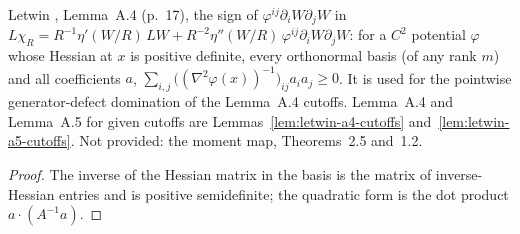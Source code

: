 \begin{lemma}
  \label{lem:letwin-inverse-hessian-quadratic}
  \leanok
  Letwin \cite{Letwin2026QuadraticKLS}, Lemma~A.4 (p.~17), the sign of $\varphi^{ij}\partial_iW\partial_jW$ in
  $L\chi_R=R^{-1}\eta'(W/R)\,LW+R^{-2}\eta''(W/R)\,\varphi^{ij}\partial_iW\partial_jW$: for a $C^2$ potential $\varphi$ whose
  Hessian at $x$ is positive definite, every orthonormal basis (of any rank $m$) and all coefficients $a$,
  $\sum_{i,j}\big((\nabla^2\varphi(x))^{-1}\big)_{ij}a_ia_j\ge0$.  It is used for the pointwise generator-defect
  domination of the Lemma~A.4 cutoffs.  Lemma~A.4 and Lemma~A.5 for given cutoffs are Lemmas~\ref{lem:letwin-a4-cutoffs}
  and~\ref{lem:letwin-a5-cutoffs}.  Not provided: the moment map, Theorems~2.5 and~1.2.
\end{lemma}
\begin{proof}
  \leanok
  The inverse of the Hessian matrix in the basis is the matrix of inverse-Hessian entries and is positive semidefinite;
  the quadratic form is the dot product $a\cdot(A^{-1}a)$.
\end{proof}

